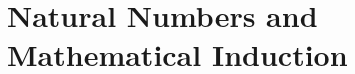 \documentclass[dvipsnames]{beamer}
\theoremstyle{plain}
\theoremstyle{definition}
\begin{document}
\section{Natural Numbers and Mathematical Induction}

\end{document}
